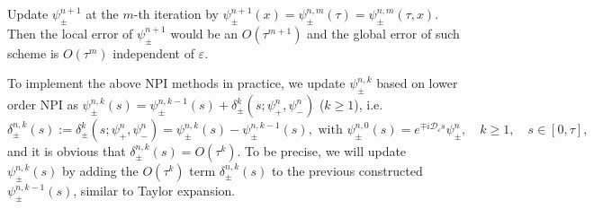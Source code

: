 \documentclass[final,leqno,showlabe]{siamltex}
\begin{document}
 Update $\psi_\pm^{n+1}$  at the $m$-th iteration by $\psi_\pm^{n+1}(x)=\psi_\pm^{n,m}(\tau)=\psi_\pm^{n,m}(\tau,x)$. Then the local error of $\psi_\pm^{n+1}$ would be an $O(\tau^{m+1})$ and the global error of such scheme is $O(\tau^m)$ independent of $\varepsilon$.

To implement the above NPI methods in practice, we update $\psi_\pm^{n,k}$ based on lower order NPI  as $\psi_\pm^{n,k}(s)=\psi_\pm^{n,k-1}(s)+\delta_\pm^{k}(s;\psi_+^n,\psi_-^n)$ ($k\ge1$), i.e.
\begin{equation}
\delta_\pm^{n,k}(s):=\delta_\pm^{k}(s;\psi_+^n,\psi_-^n)=\psi_\pm^{n,k}(s)-\psi_\pm^{n,k-1}(s),\text{ with }\psi_\pm^{n,0}(s)=e^{\mp i\mathcal{D}_\varepsilon s}\psi_\pm^n, \quad k\ge1,\quad s\in[0,\tau],
\end{equation}
and it is obvious that $\delta_\pm^{n,k}(s)=O(\tau^{k})$. To be precise, we will update $\psi_\pm^{n,k}(s)$ by adding  the $O(\tau^k)$ term $\delta_\pm^{n,k}(s)$ to the previous constructed $\psi_\pm^{n,k-1}(s)$, similar to Taylor expansion.
\end{document}

